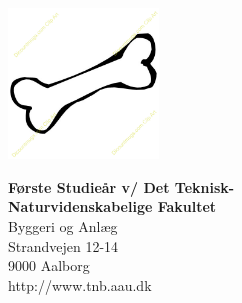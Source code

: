 

{}
\thispagestyle{empty}

\begin{minipage}[t]{0.48\textwidth}
\vspace*{-25pt}			%
\includegraphics[height=4cm]{pictures/skeleton-logo.png}
\end{minipage}
\hfill
\begin{minipage}[t]{0.48\textwidth}
{\small 
\textbf{Første Studieår v/ Det Teknisk-}\\
\textbf{Naturvidenskabelige Fakultet}  \\
Byggeri og Anlæg \\
Strandvejen 12-14 \\
9000 Aalborg \\
http://www.tnb.aau.dk}
\end{minipage}

\vspace*{1cm}

